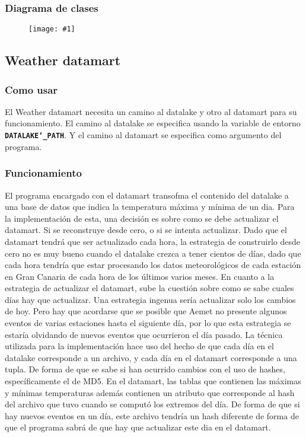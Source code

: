 \documentclass{article}
\newcommand{\cimg}[2]{
\begin{figure}[H]
	\center
		\texttt{[image: \#1]}
\end{figure}
}
\begin{document}
\subsubsection{Diagrama de clases}

\cimg{feeder}{1}

\subsection{Weather datamart}


\subsubsection{Como usar}

El Weather datamart necesita un camino al datalake y otro al datamart para su funcionamiento.
El camino al datalake se especifica usando la variable de entorno \textbf{\texttt{DATALAKE\char`_PATH}}.
Y el camino al datamart se especifica como argumento del programa.

\subsubsection{Funcionamiento}

El programa encargado con el datamart transofma el contenido del datalake a una base de datos que indica la temperatura máxima y mínima de un dia.
Para la implementación de esta, una decisión es sobre como se debe actualizar el datamart. Si se reconstruye desde cero, o si se intenta actualizar.
Dado que el datamart tendrá que ser actualizado cada hora, la estrategia de construirlo desde cero no es muy bueno cuando el datalake crezca a tener cientos de días,
dado que cada hora tendría que estar procesando los datos meteorológicos de cada estación en Gran Canaria de cada hora de los últimos varios meses.
En cuanto a la estrategia de actualizar el datamart, sube la cuestión sobre como se sabe cuales días hay que actualizar.
Una estrategia ingenua sería actualizar solo los cambios de hoy. Pero hay que acordarse que se posible que Aemet no presente algunos eventos de varias estaciones hasta el siguiente día,
por lo que esta estrategia se estaría olvidando de nuevos eventos que ocurrieron el día pasado.
La técnica utilizada para la implementación hace uso del hecho de que cada día en el datalake corresponde a un archivo, y cada día en el datamart corresponde a una tupla.
De forma de que se sabe si han ocurrido cambios con el uso de hashes, específicamente el de MD5.
En el datamart, las tablas que contienen las máximas y mínimas temperaturas además contienen un atributo que corresponde al hash del archivo que tuvo cuando se computó los extremos del día.
De forma de que si hay nuevos eventos en un día, este archivo tendría un hash diferente de forma de que el programa sabrá de que hay que actualizar este dia en el datamart.
\end{document}
